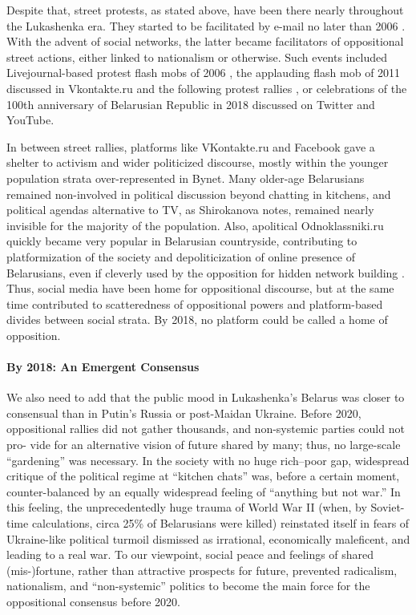 Despite that, street protests, as stated above, have been there nearly throughout the Lukashenka era. They started to be facilitated by e-mail no later than 2006 \cite[p.~29]{Shirky2011}. With the advent of social networks, the latter became facilitators of oppositional street actions, either linked to nationalism or otherwise. Such events included Livejournal-based protest flash mobs of 2006 \cite{Shirokanova}, the applauding flash mob of 2011 discussed in Vkontakte.ru and the following protest rallies \cite[p.~69]{Lesnikova} \cite{Shirokanova}, or celebrations of the 100th anniversary of Belarusian Republic in 2018 discussed on Twitter and YouTube.

In between street rallies, platforms like VKontakte.ru and Facebook gave a shelter to activism and wider politicized discourse, mostly within the younger population strata over-represented in Bynet. Many older-age Belarusians remained non-involved in political discussion beyond chatting in kitchens, and political agendas alternative to TV, as Shirokanova \cite{Shirokanova} notes, remained nearly invisible for the majority of the population. Also, apolitical Odnoklassniki.ru quickly became very popular in Belarusian countryside, contributing to platformization of the society and depoliticization of online presence of Belarusians, even if cleverly used by the opposition for hidden network building \cite[p.~236]{Herasimenka}. Thus, social media have been home for oppositional discourse, but at the same time contributed to scatteredness of oppositional powers and platform-based divides between social strata. By 2018, no platform could be called a home of opposition.

\paragraph{By 2018: An Emergent Consensus}
We also need to add that the public mood in Lukashenka’s Belarus was closer to consensual than in Putin’s Russia or post-Maidan Ukraine. Before 2020, oppositional rallies did not gather thousands, and non-systemic parties could not pro- vide for an alternative vision of future shared by many; thus, no large-scale “gardening” was necessary. In the society with no huge rich–poor gap, widespread critique of the political regime at “kitchen chats” was, before a certain moment, counter-balanced by an equally widespread feeling of “anything but not war.” In this feeling, the unprecedentedly huge trauma of World War II (when, by Soviet-time calculations, circa 25\% of Belarusians were killed) reinstated itself in fears of Ukraine-like political turmoil dismissed as irrational, economically maleficent, and leading to a real war. To our viewpoint, social peace and feelings of shared (mis-)fortune, rather than attractive prospects for future, prevented radicalism, nationalism, and “non-systemic” politics to become the main force for the oppositional consensus before 2020.

